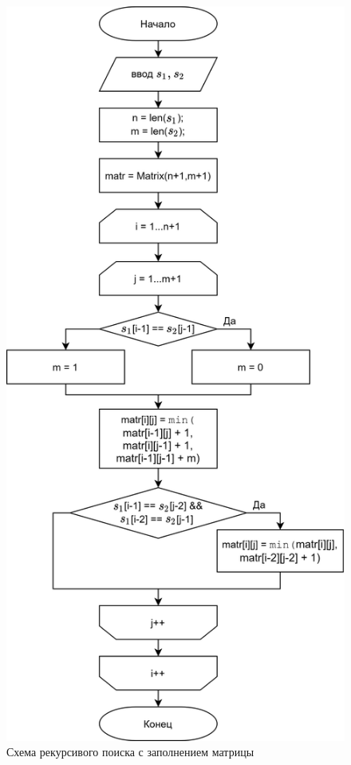     \begin{figure}[h!]
        \centering
        \includegraphics[scale=0.16]{img/DamLevMatr}
        \caption{Схема рекурсивого поиска с заполнением матрицы}
        \label{schema:rec-matr:Levenstein}
    \end{figure}

